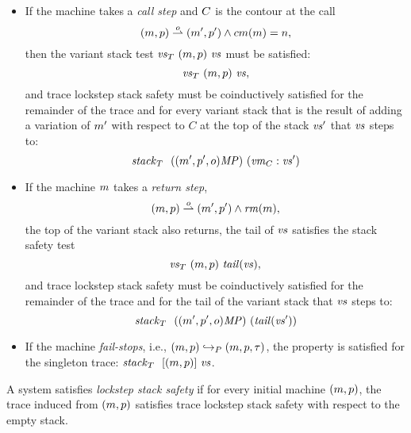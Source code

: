 \documentclass[acmsmall,review,anonymous]{acmart}\settopmatter{printfolios=true,printccs=false,printacmref=false}
\begin{document}
{\begin{itemize}
\item
  If the machine takes a \emph{call step} and $C$ is the contour at
  the call
  \[(m, p) \overset{o}{\rightharpoonup} (m', p') \wedge cm(m) = n,\]
%
  then the variant stack test $\mathit{\mathit{vs}}_T ~ (m, p) ~ \mathit{vs}$ must be
  satisfied:
  \[\mathit{\mathit{vs}}_T ~ (m, p) ~ \mathit{vs},\]
%
%
  and trace lockstep stack safety must be coinductively satisfied
  for the remainder of the trace and for every variant stack
  that is the result of adding a variation of $m'$ with
  respect to $C$ at the top of the stack $\mathit{vs}'$ that $\mathit{vs}$ steps
  to:
  \[\mathit{stack}_T ~  ~ ((m', p', o)\mathit{MP}) ~ (\mathit{vm}_{C} : \mathit{vs}')\]

\item
%
  If the machine $m$ takes a \emph{return step},
  \[(m, p) \overset{o}{\rightharpoonup} (m', p') \wedge \mathit{rm}(m),\]
  the top of the variant stack also returns,
  the tail of $\mathit{vs}$ satisfies the stack safety test
  \[\mathit{\mathit{vs}}_T ~ (m, p) ~ \mathit{tail}(\mathit{vs}),\]
  and trace lockstep stack safety must be coinductively satisfied for
  the remainder of the trace and for the tail of the variant stack
  that $\mathit{vs}$ steps to:
  \[\mathit{stack}_T ~  ~ ((m', p', o)\mathit{MP}) ~ (\mathit{tail}(\mathit{vs}'))\]

\item If the machine \emph{fail-stops}, i.e., $(m, p) \hookrightarrow_P
    (m, p, \tau)$, the property is satisfied for the singleton trace:
    $\mathit{stack}_T ~  ~ [(m, p)] ~ \mathit{vs}$.


  \end{itemize}

%
A system satisfies {\em lockstep stack safety} if for every initial machine $(m,p)$,
the trace induced from $(m, p)$ satisfies trace lockstep stack safety with
respect to the empty stack.

}
\end{document}
